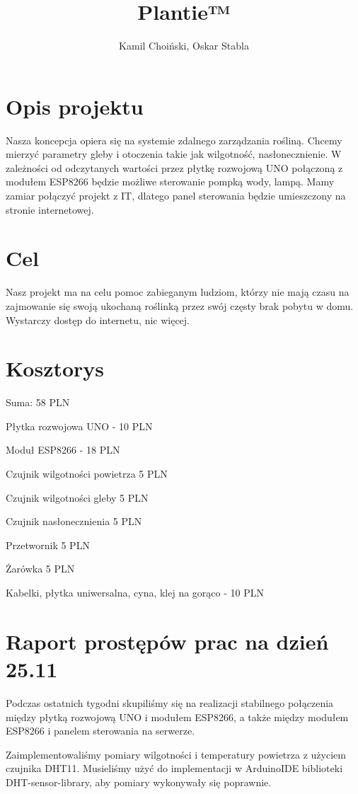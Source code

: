 \documentclass[12pt]{article}
\begin{document}
\title{Plantie™}
\author{Kamil Choiński, Oskar Stabla}
\maketitle

\section{Opis projektu}
Nasza koncepcja opiera się na systemie zdalnego zarządzania rośliną. Chcemy mierzyć parametry
gleby i otoczenia takie jak wilgotność, nasłonecznienie. W zależności od odczytanych wartości przez
płytkę rozwojową UNO połączoną z modułem ESP8266 będzie możliwe sterowanie pompką wody,
lampą. Mamy zamiar połączyć projekt z IT, dlatego panel sterowania będzie umieszczony na stronie
internetowej.

\section{Cel}
Nasz projekt ma na celu pomoc zabieganym ludziom, którzy nie mają czasu na zajmowanie się
swoją ukochaną roślinką przez swój częsty brak pobytu w domu. Wystarczy dostęp do internetu,
nic więcej.

\section{Kosztorys}
Suma: 58 PLN

Płytka rozwojowa UNO - 10 PLN

Moduł ESP8266 - 18 PLN

Czujnik wilgotności powietrza 5 PLN

Czujnik wilgotności gleby 5 PLN

Czujnik nasłonecznienia 5 PLN

Przetwornik 5 PLN

Żarówka 5 PLN

Kabelki, płytka uniwersalna, cyna, klej na gorąco - 10 PLN



\section{Raport prostępów prac na dzień 25.11}
Podczas ostatnich tygodni skupiliśmy się na realizacji stabilnego połączenia między płytką rozwojową UNO i modułem ESP8266, a także między modułem ESP8266 i panelem sterowania na serwerze.

Zaimplementowaliśmy pomiary wilgotności i temperatury powietrza z użyciem czujnika DHT11. Musieliśmy użyć do implementacji w ArduinoIDE biblioteki DHT-sensor-library, aby pomiary wykonywały się poprawnie.
\end{document}
